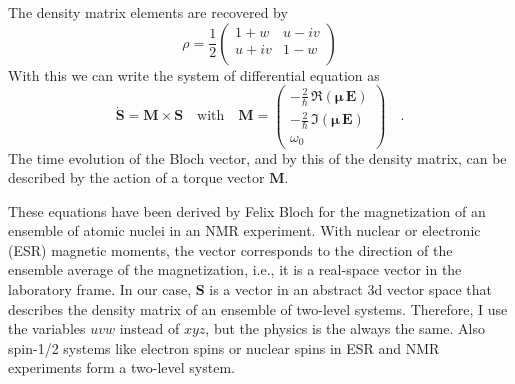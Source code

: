 The density matrix elements are recovered by
\begin{equation}
 \rho = \frac{1}{2} 
 \begin{pmatrix}
 1+ w & u - i v \\ u + i v & 1 - w\\
 \end{pmatrix}
\end{equation}
With this we can write the system of differential equation as 
\begin{equation}
 \dot{\boldsymbol{S}} = \boldsymbol{M}   \times \boldsymbol{S} 
 \quad \text{with} \quad 
 \boldsymbol{M}  = 
 \begin{pmatrix}
 -\frac{2}{\hbar} \, \Re ( \boldsymbol{\mu} \, \boldsymbol{E} ) \\
 - \frac{2}{\hbar} \, \Im ( \boldsymbol{\mu} \, \boldsymbol{E} ) \\
  \omega_0
 \end{pmatrix} \quad .
\end{equation}
The time evolution of the Bloch vector, and by this of the density matrix, can be described by the action of a torque vector $\boldsymbol{M}$. 


These equations have been derived by Felix Bloch for the magnetization of an ensemble of atomic nuclei in an NMR experiment. With nuclear or electronic (ESR) magnetic moments, the vector corresponds to the direction of the ensemble average of the magnetization, i.e., it is a real-space vector in the laboratory frame. In our case, $\mathbf{S}$ is a vector in an abstract 3d vector space that describes the density matrix of an ensemble of two-level systems. Therefore, I use the variables $uvw$ instead of $xyz$, but the physics is the  always the same. Also spin-1/2 systems like electron spins or nuclear spins in ESR and NMR experiments form a two-level system.


